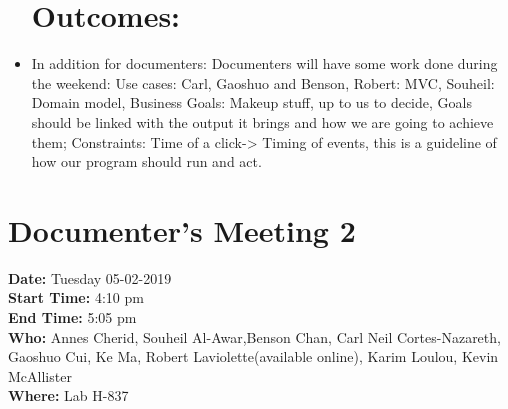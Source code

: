 \documentclass[12pt]{article}
\begin{document}
\begin{itemize}
\section{Outcomes:} 
\item In addition for documenters: Documenters will have some work done during the weekend: Use cases: Carl, Gaoshuo and Benson, Robert: MVC, Souheil: Domain model, Business Goals: Makeup stuff, up to us to decide, Goals should be linked with the output it brings and how we are going to achieve them; Constraints: Time of a click-> Timing of events, this is a guideline of how our program should run and act.
\end {itemize}

    
\section {Documenter's Meeting 2}
{\bf Date:} Tuesday 05-02-2019\\
{\bf Start Time:} 4:10 pm\\
{\bf End Time:} 5:05 pm \\
{\bf Who:} Annes Cherid, Souheil Al-Awar,Benson Chan, Carl Neil Cortes-Nazareth, Gaoshuo Cui, Ke Ma, Robert Laviolette(available online), Karim Loulou, Kevin McAllister\\
{\bf Where:} Lab H-837 \\
\end{document}
